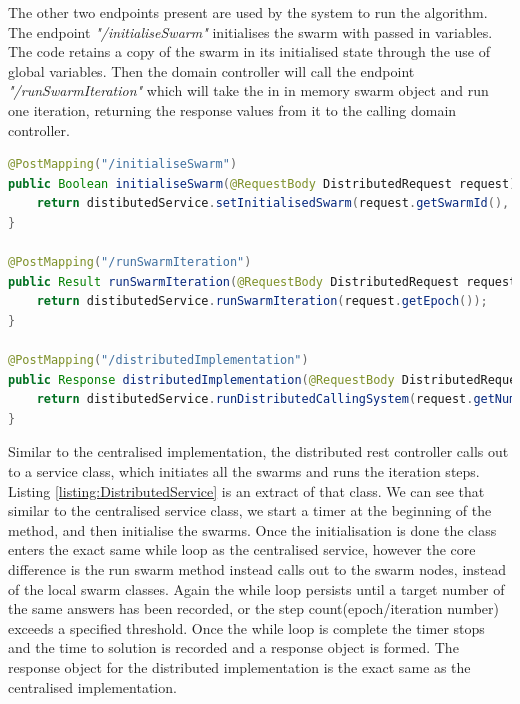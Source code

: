 \documentclass[oneside,12pt]{book}
\begin{document}
The other two endpoints present are used by the system to run the algorithm. The endpoint \textit{"/initialiseSwarm"} initialises the swarm with passed in variables. The code retains a copy of the swarm in its initialised state through the use of global variables. Then the domain controller will call the endpoint \textit{"/runSwarmIteration"} which will take the in in memory swarm object and run one iteration, returning the response values from it to the calling domain controller.

\begin{lstlisting}[basicstyle=\footnotesize, language=Java]
 @PostMapping("/initialiseSwarm")
public Boolean initialiseSwarm(@RequestBody DistributedRequest request) throws Exception {
    return distibutedService.setInitialisedSwarm(request.getSwarmId(), request.getNumberOfParticles(), request.getConfigVariables());
}

@PostMapping("/runSwarmIteration")
public Result runSwarmIteration(@RequestBody DistributedRequest request) {
    return distibutedService.runSwarmIteration(request.getEpoch());
}

@PostMapping("/distributedImplementation")
public Response distributedImplementation(@RequestBody DistributedRequest request) {
    return distibutedService.runDistributedCallingSystem(request.getNumberOfParticles(), request.getBaseUrls(), request.getConfigVariables());
}
\end{lstlisting}
\label{listing:DistributedRestController}

Similar to the centralised implementation, the distributed rest controller calls out to a service class, which initiates all the swarms and runs the iteration steps. Listing \ref{listing:DistributedService} is an extract of that class. We can see that similar to the centralised service class, we start a timer at the beginning of the method, and then initialise the swarms. Once the initialisation is done the class enters the exact same while loop as the centralised service, however the core difference is the run swarm method instead calls out to the swarm nodes, instead of the local swarm classes. Again the while loop persists until a target number of the same answers has been recorded, or the step count(epoch/iteration number) exceeds a specified threshold. Once the while loop is complete the timer stops and the time to solution is recorded and a response object is formed. The response object for the distributed implementation is the exact same as the centralised implementation.  
\end{document}

